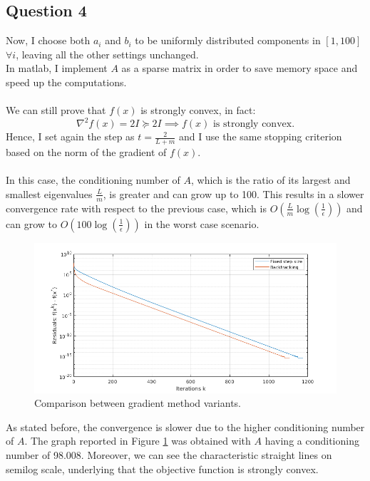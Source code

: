 \documentclass[]{article}
\begin{document}
\subsection*{Question 4}
Now, I choose both $a_i$ and $b_i$ to be uniformly distributed components in $[1,100]$ $\forall i$, leaving all the other settings unchanged.\\
In matlab, I implement $A$ as a sparse matrix in order to save memory space and speed up the computations.\\\\
We can still prove that $f(x)$ is strongly convex, in fact:
\begin{equation*}
	\nabla^2f(x)=2I\succeq2I \implies \text{$f(x)$ is strongly convex.}
\end{equation*}
Hence, I set again the step as $t =\frac{2}{L+m}$ and I use the same stopping criterion based on the norm of the gradient of $f(x)$.\\\\
In this case, the conditioning number of $A$, which is the ratio of its largest and smallest eigenvalues $\frac{L}{m}$, is greater and can grow up to 100. This results in a slower convergence rate with respect to the previous case, which is $O(\frac{L}{m}\log(\frac{1}{\epsilon}))$ and can grow to  $O(100\log(\frac{1}{\epsilon}))$ in the worst case scenario.
\begin{figure}[H]
	\includegraphics[scale=0.6]{1_4.png}
	\caption{Comparison between gradient method variants.}
	\label{1_4}
\end{figure}
As stated before, the convergence is slower due to the higher conditioning number of $A$. The graph reported in Figure \ref{1_4} was obtained with $A$ having a conditioning number of 98.008. Moreover, we can see the characteristic straight lines on semilog scale, underlying that the objective function is strongly convex.
\end{document}
